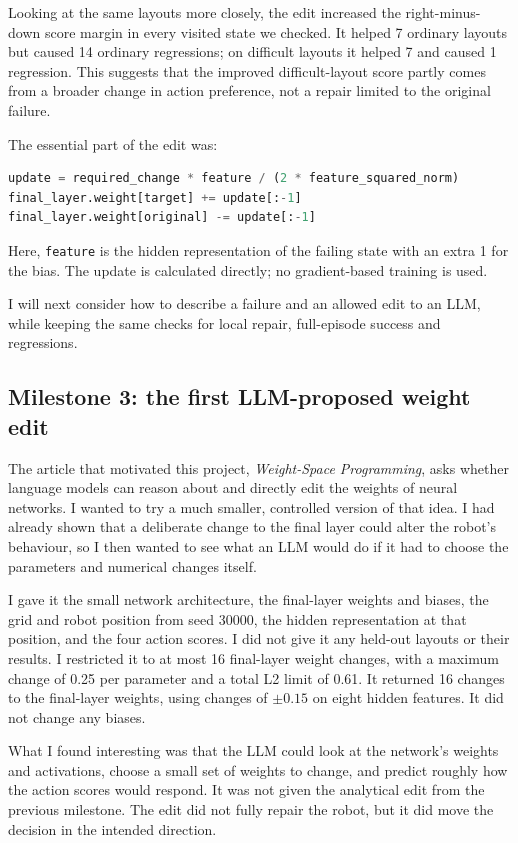 \documentclass[11pt,a4paper]{article}
\begin{document}
Looking at the same layouts more closely, the edit increased the right-minus-down score margin in every visited state we checked. It helped 7 ordinary layouts but caused 14 ordinary regressions; on difficult layouts it helped 7 and caused 1 regression. This suggests that the improved difficult-layout score partly comes from a broader change in action preference, not a repair limited to the original failure.

The essential part of the edit was:

\begin{lstlisting}[language=Python]
update = required_change * feature / (2 * feature_squared_norm)
final_layer.weight[target] += update[:-1]
final_layer.weight[original] -= update[:-1]
\end{lstlisting}

Here, \texttt{feature} is the hidden representation of the failing state with an extra 1 for the bias. The update is calculated directly; no gradient-based training is used.

I will next consider how to describe a failure and an allowed edit to an LLM, while keeping the same checks for local repair, full-episode success and regressions.

\subsection*{Milestone 3: the first LLM-proposed weight edit}

The article that motivated this project, \emph{Weight-Space Programming}, asks whether language models can reason about and directly edit the weights of neural networks. I wanted to try a much smaller, controlled version of that idea. I had already shown that a deliberate change to the final layer could alter the robot's behaviour, so I then wanted to see what an LLM would do if it had to choose the parameters and numerical changes itself.

I gave it the small network architecture, the final-layer weights and biases, the grid and robot position from seed 30000, the hidden representation at that position, and the four action scores. I did not give it any held-out layouts or their results. I restricted it to at most 16 final-layer weight changes, with a maximum change of 0.25 per parameter and a total L2 limit of 0.61. It returned 16 changes to the final-layer weights, using changes of $\pm 0.15$ on eight hidden features. It did not change any biases.

What I found interesting was that the LLM could look at the network's weights and activations, choose a small set of weights to change, and predict roughly how the action scores would respond. It was not given the analytical edit from the previous milestone. The edit did not fully repair the robot, but it did move the decision in the intended direction.
\end{document}
